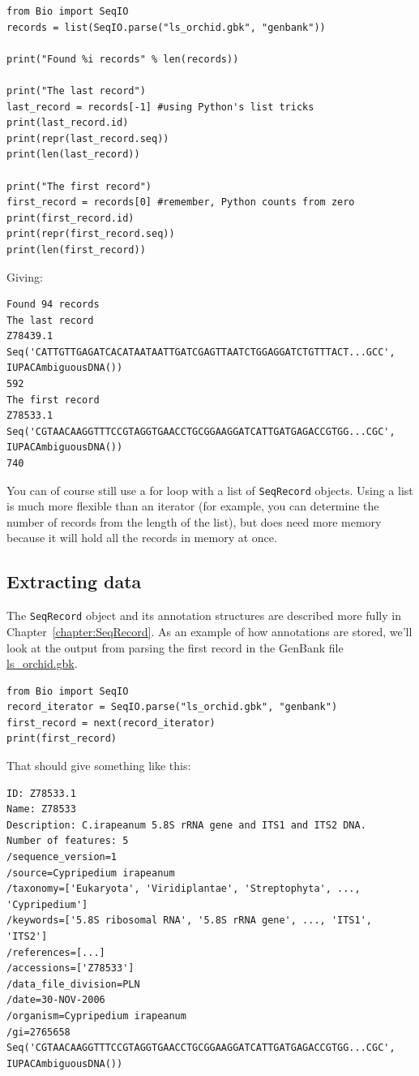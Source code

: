 \documentclass{report}
\begin{document}
\begin{verbatim}
from Bio import SeqIO
records = list(SeqIO.parse("ls_orchid.gbk", "genbank"))

print("Found %i records" % len(records))

print("The last record")
last_record = records[-1] #using Python's list tricks
print(last_record.id)
print(repr(last_record.seq))
print(len(last_record))

print("The first record")
first_record = records[0] #remember, Python counts from zero
print(first_record.id)
print(repr(first_record.seq))
print(len(first_record))
\end{verbatim}

\noindent Giving:

\begin{verbatim}
Found 94 records
The last record
Z78439.1
Seq('CATTGTTGAGATCACATAATAATTGATCGAGTTAATCTGGAGGATCTGTTTACT...GCC', IUPACAmbiguousDNA())
592
The first record
Z78533.1
Seq('CGTAACAAGGTTTCCGTAGGTGAACCTGCGGAAGGATCATTGATGAGACCGTGG...CGC', IUPACAmbiguousDNA())
740
\end{verbatim}

You can of course still use a for loop with a list of \verb|SeqRecord| objects.  Using a list is much more flexible than an iterator (for example, you can determine the number of records from the length of the list), but does need more memory because it will hold all the records in memory at once.

\subsection{Extracting data}

The \verb|SeqRecord| object and its annotation structures are described more fully in
Chapter~\ref{chapter:SeqRecord}.  As an example of how annotations are stored, we'll look at the output from parsing the first record in the GenBank file \href{http://biopython.org/DIST/docs/tutorial/examples/ls_orchid.gbk}{ls\_orchid.gbk}.

\begin{verbatim}
from Bio import SeqIO
record_iterator = SeqIO.parse("ls_orchid.gbk", "genbank")
first_record = next(record_iterator)
print(first_record)
\end{verbatim}

\noindent That should give something like this:

\begin{verbatim}
ID: Z78533.1
Name: Z78533
Description: C.irapeanum 5.8S rRNA gene and ITS1 and ITS2 DNA.
Number of features: 5
/sequence_version=1
/source=Cypripedium irapeanum
/taxonomy=['Eukaryota', 'Viridiplantae', 'Streptophyta', ..., 'Cypripedium']
/keywords=['5.8S ribosomal RNA', '5.8S rRNA gene', ..., 'ITS1', 'ITS2']
/references=[...]
/accessions=['Z78533']
/data_file_division=PLN
/date=30-NOV-2006
/organism=Cypripedium irapeanum
/gi=2765658
Seq('CGTAACAAGGTTTCCGTAGGTGAACCTGCGGAAGGATCATTGATGAGACCGTGG...CGC', IUPACAmbiguousDNA())
\end{verbatim}
\end{document}

